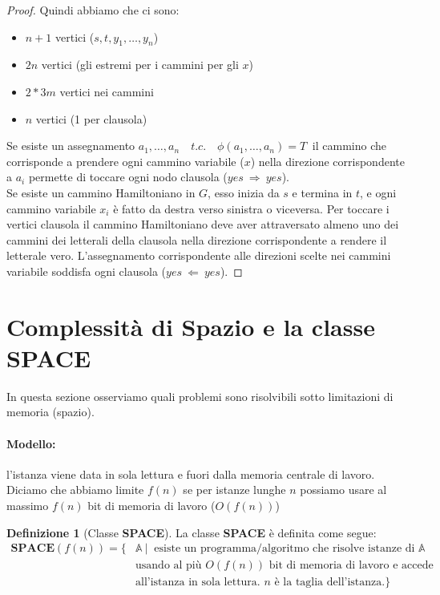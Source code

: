 \documentclass[a4paper]{article}
\theoremstyle{definition}
\newtheorem{definit}{Definizione}[subsection]
\newcommand{\Space}{\mathbf{SPACE}}
\newcommand{\prob}[1]{\mathbb{#1}}
\begin{document}
\begin{proof}
				Quindi abbiamo che ci sono:
				\begin{itemize}
					\item $ n + 1 $ vertici ($ s, t, y_1, \dots, y_n $)
					\item $ 2n $ vertici (gli estremi per i cammini per gli $ x $)
					\item $ 2 * 3m $ vertici nei cammini
					\item $ n $ vertici (1 per clausola)
				\end{itemize}
				Se esiste un assegnamento $ a_1, \dots, a_n\quad t.c.\quad \phi(a_1, \dots, a_n) = T\ $ il cammino che corrisponde a prendere ogni cammino variabile ($ x $) nella direzione corrispondente a $ a_i $ permette di toccare ogni nodo clausola ($ yes\ \Rightarrow\ yes $).\\
				
				\noindent
				Se esiste un cammino Hamiltoniano in $ G $, esso inizia da $ s $ e termina in $ t $, e ogni cammino variabile $ x_i $ è fatto da destra verso sinistra o viceversa. Per toccare i vertici clausola il cammino Hamiltoniano deve aver attraversato almeno uno dei cammini dei letterali della clausola nella direzione corrispondente a rendere il letterale vero. L'assegnamento corrispondente alle direzioni scelte nei cammini variabile soddisfa ogni clausola ($ yes\ \Leftarrow\ yes $).
 				
			\end{proof}
			
		\newpage
	\section{Complessità di Spazio e la classe SPACE}
		In questa sezione osserviamo quali problemi sono risolvibili sotto limitazioni di memoria (spazio).
		\paragraph{Modello:} l'istanza viene data in sola lettura e fuori dalla memoria centrale di lavoro. Diciamo che abbiamo limite $ f(n) $ se per istanze lunghe $ n $ possiamo usare al massimo $ f(n) $ bit di memoria di lavoro ($ O(f(n)) $)
		
		\begin{definit}[Classe \textbf{SPACE}]
			La classe \textbf{SPACE} è definita come segue:
			\begin{align*}
				\Space(f(n)) = \big\lbrace & \prob{A}\ \Big|\ \text{ esiste un programma/algoritmo che risolve istanze di } \prob{A} \\ 
				&\text{usando al più } O(f(n)) \text{ bit di memoria di lavoro e accede }\\
				&\text{all'istanza in sola lettura. } n \text{ è la taglia dell'istanza}. \big\rbrace
			\end{align*}
		\end{definit}
		
\end{document}
